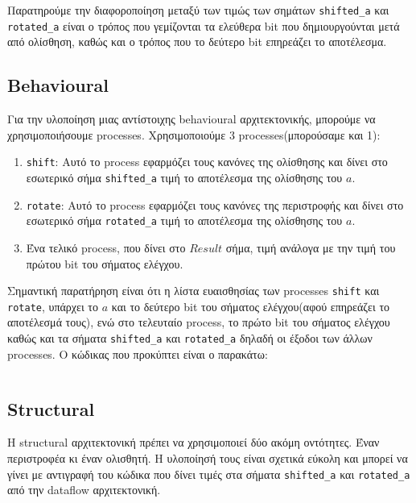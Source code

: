 \documentclass[11pt, a4paper]{report}
\begin{document}
Παρατηρούμε την διαφοροποίηση μεταξύ των τιμώς των σημάτων \texttt{shifted_a} και \texttt{rotated_a} είναι ο τρόπος που γεμίζονται τα ελεύθερα bit που δημιουργούνται μετά από ολίσθηση, καθώς και ο τρόπος που το δεύτερο bit επηρεάζει το αποτέλεσμα.

\subsection{Behavioural}
Για την υλοποίηση μιας αντίστοιχης behavioural αρχιτεκτονικής, μπορούμε να χρησιμοποιήσουμε processes.
Χρησιμοποιούμε 3 processes(μπορούσαμε και 1):
\begin{enumerate}
  \item \texttt{shift}: Αυτό το process εφαρμόζει τους κανόνες της ολίσθησης και δίνει στο εσωτερικό σήμα \texttt{shifted_a} τιμή το αποτέλεσμα της ολίσθησης του $a$.
  \item \texttt{rotate}: Αυτό το process εφαρμόζει τους κανόνες της περιστροφής και δίνει στο εσωτερικό σήμα \texttt{rotated_a} τιμή το αποτέλεσμα της ολίσθησης του $a$.
  \item Ένα τελικό process, που δίνει στο $Result$ σήμα, τιμή ανάλογα με την τιμή του πρώτου bit του σήματος ελέγχου.
\end{enumerate}

Σημαντική παρατήρηση είναι ότι η λίστα ευαισθησίας των processes \texttt{shift} και \texttt{rotate}, υπάρχει το $a$ και το δεύτερο bit του σήματος ελέγχου(αφού επηρεάζει το αποτέλεσμά τους), ενώ στο τελευταίο process, το πρώτο bit του σήματος ελέγχου καθώς και τα σήματα \texttt{shifted_a} και \texttt{rotated_a} δηλαδή οι έξοδοι των άλλων processes.
Ο κώδικας που προκύπτει είναι ο παρακάτω:
\inputminted[breaklines, linenos, firstline=32, lastline=62]{vhdl}{./code/part-2/alu-2/alu.vhdl}

\subsection{Structural}
Η structural αρχιτεκτονική πρέπει να χρησιμοποιεί δύο ακόμη οντότητες. Έναν περιστροφέα κι έναν ολισθητή.
Η υλοποίησή τους είναι σχετικά εύκολη και μπορεί να γίνει με αντιγραφή του κώδικα που δίνει τιμές στα σήματα \texttt{shifted_a} και \texttt{rotated_a} από την dataflow αρχιτεκτονική.
\inputminted[breaklines, linenos]{vhdl}{./code/part-2/alu-2/shiftlr_4bit.vhdl}
\inputminted[breaklines, linenos]{vhdl}{./code/part-2/alu-2/rotatelr_4bit.vhdl}
\end{document}
